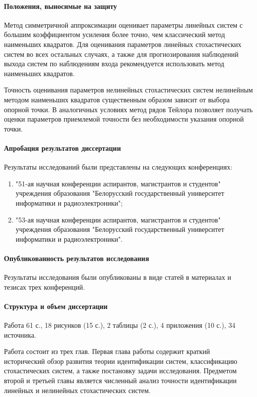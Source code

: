 {\paragraph{Положения, выносимые на защиту}

Метод симметричной аппроксимации оценивает параметры линейных систем с
большим коэффициентом усиления более точно, чем классический метод
наименьших квадратов. Для оценивания параметров линейных стохастических
систем во всех остальных случаях, а также для прогнозирования наблюдений
выхода систем по наблюдениям входа рекомендуется использовать метод
наименьших квадратов.

Точность оценивания параметров нелинейных стохастических систем
нелинейным методом наименьших квадратов существенным образом
зависит от выбора опорной точки.
В аналогичных условиях метод рядов Тейлора позволяет получать оценки параметров
приемлемой точности без необходимости указания опорной точки.

\paragraph{Апробация результатов диссертации}
Результаты исследований были представлены на следующих конференциях:
\begin{enumerate}
\item "51-ая научная конференции аспирантов, магистрантов и студентов"
  учреждения образования
  "Белорусский государственный университет информатики и радиоэлектроники";
\item "53-ая научная конференции аспирантов, магистрантов и студентов"
  учреждения образования
  "Белорусский государственный университет информатики и радиоэлектроники".
\end{enumerate}

\paragraph{Опубликованность результатов исследования}
Результаты исследования были опубликованы в виде статей в
материалах и тезисах трех конференций.

\paragraph{Структура и объем диссертации}

Работа 61 с., 18 рисунков (15 с.), 2 таблицы (2 с.), 4 приложения (10 с.),
34 источника.

Работа состоит из трех глав.
Первая глава работы содержит краткий исторический обзор развития теории
идентификации систем, классификацию стохастических систем,
а также постановку задачи исследования.
Предметом второй и третьей главы является численный анализ точности идентификации
линейных и нелинейных стохастических систем.
}